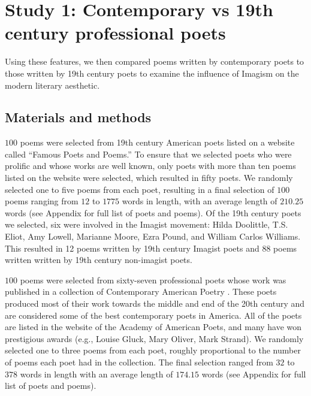 \documentclass{book}
\begin{document}

\section{Study 1: Contemporary vs 19th century professional poets}
Using these features, we then compared poems written by contemporary poets to those written by 19th century poets to examine the influence of Imagism on the modern literary aesthetic.

\subsection{Materials and methods}

$100$ poems were selected from 19th century American poets listed on a website called ``Famous Poets and Poems.'' To ensure that we selected poets who were prolific and whose works are well known, only poets with more than ten poems listed on the website were selected, which resulted in fifty poets. We randomly selected one to five poems from each poet, resulting in a final selection of $100$ poems ranging from $12$ to $1775$ words in length, with an average length of $210.25$ words (see Appendix for full list of poets and poems). %
Of the 19th century poets we selected, six were involved in the Imagist movement: Hilda Doolittle, T.S. Eliot, Amy Lowell, Marianne Moore, Ezra Pound, and William Carlos Williams. This resulted in 12 poems written by 19th century Imagist poets and 88 poems written written by 19th century non-imagist poets. 
 
$100$ poems were selected from sixty-seven professional poets whose work was published in a collection of Contemporary American Poetry \citep{ContempAmPoetry}. These poets produced most of their work towards the middle and end of the 20th century and are considered some of the best contemporary poets in America. All of the poets are listed in the website of the Academy of American Poets, and many have won prestigious awards (e.g., Louise Gluck, Mary Oliver, Mark Strand). We randomly selected one to three poems from each poet, roughly proportional to the number of poems each poet had in the collection. The final selection ranged from $32$ to $378$ words in length with an average length of $174.15$ words (see Appendix for full list of poets and poems).
\end{document}
